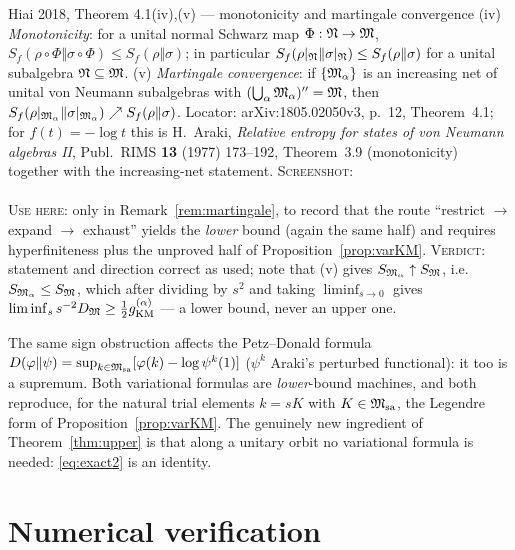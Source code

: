 \documentclass[11pt]{article}
\newcommand{\Msa}{\cM_{\mathrm{sa}}}\newcommand{\Mpsa}{\cM'_{\mathrm{sa}}}
\newcommand{\gKM}{g_{\mathrm{KM}}}\newcommand{\gB}{g_{\mathrm B}}
\begin{document}
\begin{citedbox}{Hiai 2018, Theorem 4.1(iv),(v) --- monotonicity and martingale convergence}
(iv) \emph{Monotonicity}: for a unital normal Schwarz map $\Phi:\mathfrak N\to\mathfrak M$,
$S_f(\rho\circ\Phi\Vert\sigma\circ\Phi)\le S_f(\rho\Vert\sigma)$; in particular
$S_f(\rho|_{\mathfrak N}\Vert\sigma|_{\mathfrak N})\le S_f(\rho\Vert\sigma)$ for a unital subalgebra $\mathfrak N\subseteq\mathfrak M$.
(v) \emph{Martingale convergence}: if $\{\mathfrak M_\alpha\}$ is an increasing net of unital von Neumann
subalgebras with $(\bigcup_\alpha\mathfrak M_\alpha)''=\mathfrak M$, then
$S_f(\rho|_{\mathfrak M_\alpha}\Vert\sigma|_{\mathfrak M_\alpha})\nearrow S_f(\rho\Vert\sigma)$.
Locator: arXiv:1805.02050v3, p.~12, Theorem~4.1; for $f(t)=-\log t$ this is
H.~Araki, \emph{Relative entropy for states of von Neumann algebras II}, Publ.\ RIMS \textbf{13} (1977)
173--192, Theorem~3.9 (monotonicity) together with the increasing-net statement.
\textsc{Screenshot:}\\
\\
\textsc{Use here:} only in Remark~\ref{rem:martingale}, to record that the route
``restrict $\to$ expand $\to$ exhaust'' yields the \emph{lower} bound (again the same half) and requires
hyperfiniteness plus the unproved half of Proposition~\ref{prop:varKM}.  \textsc{Verdict:} statement and
direction correct as used; note that (v) gives $S_{\mathfrak M_\alpha}\uparrow S_{\mathfrak M}$, i.e.\
$S_{\mathfrak M_\alpha}\le S_{\mathfrak M}$, which after dividing by $s^2$ and taking $\liminf_{s\to0}$ gives
$\liminf_ss^{-2}D_{\cM}\ge\frac12\gKM^{(\alpha)}$ --- a lower bound, never an upper one.
\end{citedbox}

\begin{remark}
The same sign obstruction affects the Petz--Donald formula
$D(\varphi\Vert\psi)=\sup_{k\in\Msa}[\varphi(k)-\log\psi^{k}(1)]$ ($\psi^k$ Araki's perturbed functional):
it too is a supremum.  Both variational formulas are \emph{lower}-bound machines, and both reproduce, for
the natural trial elements $k=sK$ with $K\in\Msa$, the Legendre form of Proposition~\ref{prop:varKM}.
The genuinely new ingredient of Theorem~\ref{thm:upper} is that along a unitary orbit no variational
formula is needed: \eqref{eq:exact2} is an identity.
\end{remark}

\section{Numerical verification}\label{sec:num}
\end{document}
